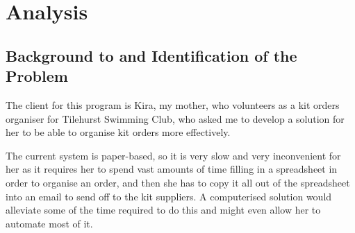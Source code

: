 \documentclass[
11pt, %
a4paper, %
oneside, %
headinclude,footinclude, %
BCOR5mm, %
]{scrartcl}
\begin{document}



\section{Analysis}
\subsection{Background to and Identification of the Problem}
The client for this program is Kira, my mother, who volunteers as a kit orders organiser for Tilehurst Swimming Club, who asked me to develop a solution for her to be able to organise kit orders more effectively. \par The current system is paper-based, so it is very slow and very inconvenient for her as it requires her to spend vast amounts of time filling in a spreadsheet in order to organise an order, and then she has to copy it all out of the spreadsheet into an email to send off to the kit suppliers. A computerised solution would alleviate some of the time required to do this and might even allow her to automate most of it.
\end{document}
